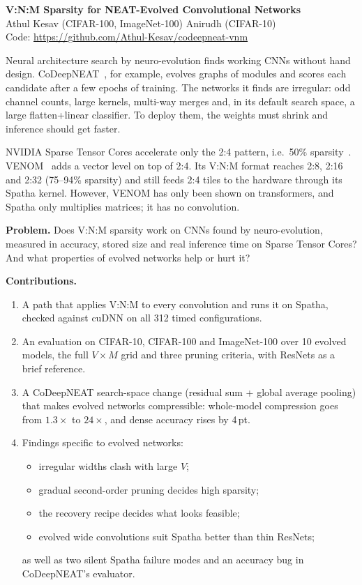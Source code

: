 \documentclass[10pt,a4paper]{article}
\makeatletter
\newcommand{\B}[1]{\textbf{#1}}
\renewcommand\section{\@startsection{section}{1}{\z@}{-1.8ex plus -.4ex}{0.8ex}{\normalfont\large\bfseries}}
\makeatother
\begin{document}
\begin{center}
{\LARGE\bfseries V:N:M Sparsity for NEAT-Evolved Convolutional Networks}\\[4pt]
{\large Athul Kesav (CIFAR-100, ImageNet-100) \quad Anirudh (CIFAR-10)}\\[2pt]
{\small Code: \url{https://github.com/Athul-Kesav/codeepneat-vnm}}
\end{center}

\section{Introduction}
Neural architecture search by neuro-evolution finds working CNNs without hand design.
CoDeepNEAT~\cite{codeepneat}, for example, evolves graphs of modules and scores each candidate after a few epochs of training.
The networks it finds are irregular: odd channel counts, large kernels, multi-way merges and, in its default search space, a large flatten+linear classifier.
To deploy them, the weights must shrink and inference should get faster.

NVIDIA Sparse Tensor Cores accelerate only the 2:4 pattern, i.e.\ 50\% sparsity~\cite{nm_nvidia}.
VENOM~\cite{venom} adds a vector level on top of 2:4. Its V:N:M format reaches 2:8, 2:16 and 2:32 (75--94\% sparsity) and still feeds 2:4 tiles to the hardware through its Spatha kernel.
However, VENOM has only been shown on transformers, and Spatha only multiplies matrices; it has no convolution.

\B{Problem.} Does V:N:M sparsity work on CNNs found by neuro-evolution, measured in accuracy, stored size and real inference time on Sparse Tensor Cores? And what properties of evolved networks help or hurt it?

\B{Contributions.}
\begin{enumerate}[label=(\arabic*)]
\item A path that applies V:N:M to every convolution and runs it on Spatha, checked against cuDNN on all 312 timed configurations.
\item An evaluation on CIFAR-10, CIFAR-100 and ImageNet-100 over 10 evolved models, the full $V\times M$ grid and three pruning criteria, with ResNets as a brief reference.
\item A CoDeepNEAT search-space change (residual sum + global average pooling) that makes evolved networks compressible: whole-model compression goes from $1.3\times$ to $24\times$, and dense accuracy rises by 4\,pt.
\item Findings specific to evolved networks:
  \begin{itemize}
  \item irregular widths clash with large $V$;
  \item gradual second-order pruning decides high sparsity;
  \item the recovery recipe decides what looks feasible;
  \item evolved wide convolutions suit Spatha better than thin ResNets;
  \end{itemize}
  as well as two silent Spatha failure modes and an accuracy bug in CoDeepNEAT's evaluator.
\end{enumerate}
\end{document}
